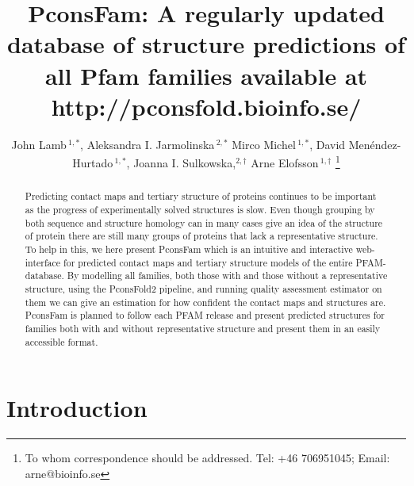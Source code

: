 \documentclass[a4,center,fleqn]{NAR}
\begin{document}
\title{PconsFam: A regularly updated database of structure predictions of all Pfam families available at http://pconsfold.bioinfo.se/}

\author{%
John Lamb\,$^{1,*}$,
Aleksandra I. Jarmolinska\,$^{2,*}$
Mirco Michel\,$^{1,*}$,
David Menéndez-Hurtado\,$^{1,*}$,
Joanna I. Sulkowska,$^{2,\dagger}$
Arne Elofsson\,$^{1,\dagger}$%
\footnote{To whom correspondence should be addressed.
Tel: +46 706951045; Email: arne@bioinfo.se}}

\address{%
$^{1}$Science for Life Laboratory and Department of Biochemistry and
biophysics, Stockholm University, Tomtebodav 23, 171 21 Solna, Sweden
and
$^{2}$ Centre of New Technologies, University of Warsaw, Banacha 2c, 02-097 Warsaw,
Poland
$^{*}$ contributed equally
$^{\dagger}$=contributing authors
}


\maketitle




\begin{abstract}
Predicting contact maps and tertiary structure of proteins continues
to be important as the progress of experimentally solved structures
is slow. 
Even though grouping by both sequence and structure homology can in many
cases give an idea of the structure of protein there are still
many groups of proteins that lack a representative structure.
To help in this, we here present PconsFam which is an intuitive and
interactive web-interface for predicted contact maps and tertiary
structure models of the entire PFAM-database.
By modelling all families, both those with and those without a
representative structure, using the PconsFold2 pipeline, and running
quality assessment estimator on them we can give an estimation for how
confident the contact maps and structures are. 
PconsFam is planned to follow each PFAM release and present predicted
structures for families both with and without representative structure
and present them in an easily accessible format.

\end{abstract}

\section{Introduction}
\end{document}

